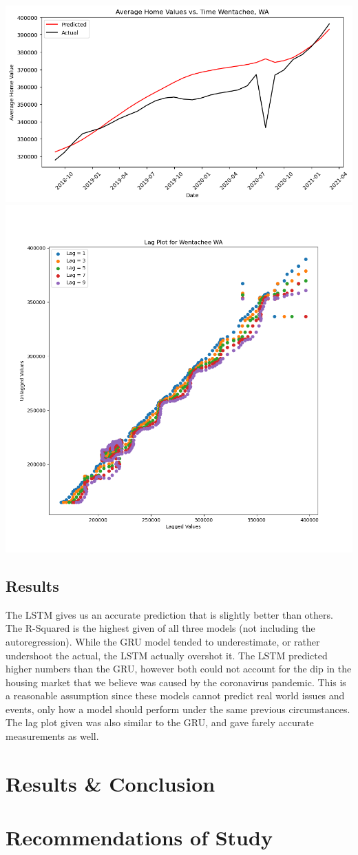 \documentclass{article}
\begin{document}
	\includegraphics[scale = 0.2]{../plots/wentachee_1d_lstm.png}
	\includegraphics[scale = 0.2]{../plots/wentachee_lag.png}

	\subsection{Results}

	The LSTM gives us an accurate prediction that is slightly better than others. The R-Squared is the
	highest given of all three models (not including the autoregression). While the GRU model tended to
	underestimate, or rather undershoot the actual, the LSTM actually overshot it. The LSTM predicted
	higher numbers than the GRU, however both could not account for the dip in the housing market that 
	we believe was caused by the coronavirus pandemic. This is a reasonable assumption since these models
	cannot predict real world issues and events, only how a model should perform under the same previous
	circumstances. The lag plot given was also similar to the GRU, and gave farely accurate measurements
	as well.
	
	\section{Results \& Conclusion}
	\section{Recommendations of Study}
	
\end{document}

